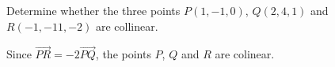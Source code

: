 
\begin{Exercise}[
name={},
title={}, 
difficulty=0,
origin={\cite{SM}}]
Determine whether the three points $P(1,-1,0)$, $Q(2,4,1)$ and $R(-1,-11,-2)$ are collinear.
\end{Exercise}

\begin{Answer}
Since $\vec{PR}=-2\vec{PQ}$, the points $P$, $Q$ and $R$ are colinear.
\end{Answer}
